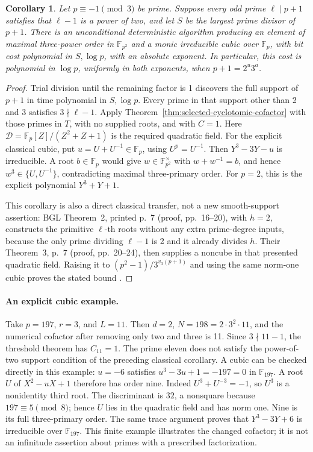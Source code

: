 \documentclass[11pt]{article}
\newtheorem{corollary}[theorem]{Corollary}
\theoremstyle{definition}
\theoremstyle{remark}
\begin{document}
\begin{corollary}\label{cor:fermat-supported-cubic}
Let \(p\equiv-1\pmod3\) be prime. Suppose every odd prime
\(\ell\mid p+1\) satisfies that \(\ell-1\) is a power of
two, and let \(S\) be the largest prime divisor of \(p+1\).
There is an unconditional deterministic algorithm producing
an element of maximal three-power order in \(\mathbb F_{p^2}\)
and a monic irreducible cubic over \(\mathbb F_p\), with bit
cost polynomial in \(S,\log p\), with an absolute exponent.
In particular, this cost is polynomial in \(\log p\),
uniformly in both exponents, when \(p+1=2^u3^a\).
\end{corollary}
\begin{proof}
Trial division until the remaining factor is 1 discovers the full
support of \(p+1\) in time polynomial in \(S,\log p\).
Every prime in that support other than 2 and 3 satisfies
\(3\nmid\ell-1\). Apply
Theorem~\ref{thm:selected-cyclotomic-cofactor} with those primes
in \(T\), with no supplied roots, and with \(C=1\).
Here \(\mathcal D=\mathbb F_p[Z]/(Z^2+Z+1)\) is the
required quadratic field. For the explicit classical cubic,
put \(u=U+U^{-1}\in\mathbb F_p\), using \(U^p=U^{-1}\).
Then \(Y^3-3Y-u\) is irreducible. A root \(b\in\mathbb F_p\)
would give \(w\in\mathbb F_{p^2}^\times\) with
\(w+w^{-1}=b\), and hence \(w^3\in\{U,U^{-1}\}\),
contradicting maximal three-primary order. For \(p=2\), this
is the explicit polynomial \(Y^3+Y+1\).

This corollary is also a direct classical transfer, not a new
smooth-support assertion: BGL Theorem~2, printed p.~7
(proof, pp.~16--20), with \(h=2\), constructs the primitive
\(\ell\)-th roots without any extra prime-degree inputs,
because the only prime dividing \(\ell-1\) is 2 and it already
divides \(h\). Their Theorem~3, p.~7 (proof, pp.~20--24),
then supplies a noncube in that presented quadratic field.
Raising it to \((p^2-1)/3^{v_3(p+1)}\) and using the same
norm-one cubic proves the stated bound \citep{BGL2001}.
\end{proof}

\paragraph{An explicit cubic example.}
Take \(p=197\), \(r=3\), and \(L=11\). Then
\(d=2\), \(N=198=2\cdot3^2\cdot11\), and the numerical
cofactor after removing only two and three is 11. Since
\(3\nmid11-1\), the threshold theorem has \(C_{11}=1\).
The prime eleven does not satisfy the power-of-two support condition
of the preceding classical corollary. A cubic can be checked directly
in this example: \(u=-6\) satisfies
\(u^3-3u+1=-197=0\) in \(\mathbb F_{197}\).
A root \(U\) of \(X^2-uX+1\) therefore has order nine.
Indeed \(U^3+U^{-3}=-1\), so \(U^3\) is a nonidentity
third root. The discriminant is \(32\), a nonsquare because
\(197\equiv5\pmod8\); hence \(U\) lies in the quadratic
field and has norm one. Nine is its full three-primary order.
The same trace argument proves that
\(Y^3-3Y+6\) is irreducible over \(\mathbb F_{197}\).
This finite example illustrates the changed cofactor; it is not
an infinitude assertion about primes with a prescribed factorization.
\end{document}
